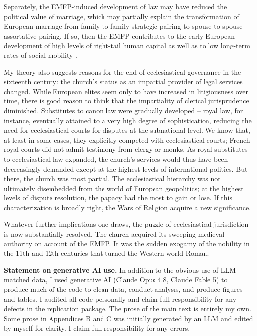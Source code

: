 \documentclass[12pt]{article}
\theoremstyle{definition}
\theoremstyle{remark}
\begin{document}
Separately, the EMFP-induced development of law may have reduced the political value of marriage, which may partially explain the transformation of European marriage from family-to-family strategic pairing to spouse-to-spouse assortative pairing. If so, then the EMFP contributes to the early European development of high levels of right-tail human capital as well as to low long-term rates of social mobility \citep{clark_cummins_2022}.

My theory also suggests reasons for the end of ecclesiastical governance in the sixteenth century: the church's status as an impartial provider of legal services changed. While European elites seem only to have increased in litigiousness over time, there is good reason to think that the impartiality of clerical jurisprudence diminished. Substitutes to canon law were gradually developed -- royal law, for instance, eventually attained to a very high degree of sophistication, reducing the need for ecclesiastical courts for disputes at the subnational level. We know that, at least in some cases, they explicitly competed with ecclesiastical courts; French royal courts did not admit testimony from clergy or monks. As royal substitutes to ecclesiastical law expanded, the church's services would thus have been decreasingly demanded except at the highest levels of international politics. But there, the church was most partial. The ecclesiastical hierarchy was not ultimately disembedded from the world of European geopolitics; at the highest levels of dispute resolution, the papacy had the most to gain or lose. If this characterization is broadly right, the Wars of Religion acquire a new significance.

Whatever further implications one draws, the puzzle of ecclesiastical jurisdiction is now substantially resolved. The church acquired its sweeping medieval authority on account of the EMFP. It was the sudden exogamy of the nobility in the 11th and 12th centuries that turned the Western world Roman. 

\vspace{\baselineskip}

\noindent \textbf{Statement on generative AI use.} In addition to the obvious use of LLM-matched data, I used generative AI (Claude Opus 4.8, Claude Fable 5) to produce much of the code to clean data, conduct analysis, and produce figures and tables. I audited all code personally and claim full responsibility for any defects in the replication package. The prose of the main text is entirely my own. Some prose in Appendices B and C was initially generated by an LLM and edited by myself for clarity. I claim full responsibility for any errors.
\end{document}
